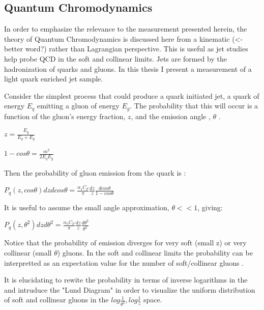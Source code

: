 \subsection{Quantum Chromodynamics}\label{secSM:ch1}


In order to emphasize the relevance to the measurement presented herein, the theory of Quantum Chromodynamics is discussed here from a kinematic (<- better word?) rather than Lagrangian perspective. This is useful as jet studies help probe QCD in the soft and collinear limits. 
Jets are formed by the hadronization of quarks and gluons. In this thesis I present a measurement of a light quark enriched jet sample. 



Consider the simplest process that could produce a quark initiated jet, a quark of energy $E_q$  emitting a gluon of energy $E_g$. The probability that this will occur is a function of the gluon's energy fraction, $z$, and the emission angle , $\theta$  \cite{Larkoski:2017fip}.\newline


$z = \frac{E_g}{E_q + E_g}$\newline

$1 - cos \theta = \frac{m^2}{2 E_q E_g}$\newline

Then the probability of gluon emission from the quark is :


$P_q(z,cos \theta) dz d cos \theta = \frac{\alpha_s C_F}{\pi}  \frac{dz}{z} \frac{dcos \theta}{1 - cos \theta}  $\newline

It is useful to assume the small angle approximation, $\theta << 1$, giving:\newline


$P_q(z,\theta^2) dz d \theta^2 = \frac{\alpha_s C_F}{\pi}  \frac{dz}{z} \frac{d \theta^2}{ \theta^2}  $\newline

Notice that the probability of emission diverges for very soft (small z) or very collinear (small $\theta$) gluons. In the soft and collinear limits the probability can be interpretted as an expectation value for the number of soft/collinear gluons \cite{Larkoski:2017fip}.

It is elucidating to rewite the probability in terms of inverse logarithms in the and intruduce the "Lund Diagram" in order to visualize the uniform distribution of soft and collinear gluons in the $log \frac{1}{ \theta^2} , log\frac{1}{z} $ space.

